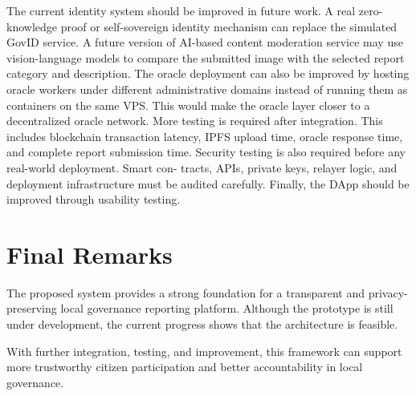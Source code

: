 The current identity system should be improved in future work. A real zero- knowledge proof or self-sovereign identity mechanism can replace the simulated GovID service. A future version of AI-based content moderation service may use vision-language models to compare the submitted image with the selected report category and description. The oracle deployment can also be improved by hosting oracle workers under different administrative domains instead of running them as containers on the same VPS. This would make the oracle layer closer to a decentralized oracle network. More testing is required after integration. This includes blockchain transaction latency, IPFS upload time, oracle response time, and complete report submission time. Security testing is also required before any real-world deployment. Smart con- tracts, APIs, private keys, relayer logic, and deployment infrastructure must be audited carefully. Finally, the DApp should be improved through usability testing.
\section{Final Remarks}

 The proposed system provides a strong foundation for a transparent and privacy- preserving local governance reporting platform. Although the prototype is still under development, the current progress shows that the architecture is feasible.

With further integration, testing, and improvement, this framework can support more trustworthy citizen participation and better accountability in local governance.